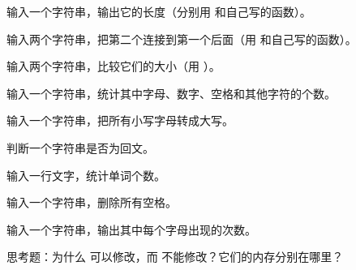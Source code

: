 \begin{problemset}
  \item 输入一个字符串，输出它的长度（分别用  和自己写的函数）。
  \item 输入两个字符串，把第二个连接到第一个后面（用  和自己写的函数）。
  \item 输入两个字符串，比较它们的大小（用 ）。
  \item 输入一个字符串，统计其中字母、数字、空格和其他字符的个数。
  \item 输入一个字符串，把所有小写字母转成大写。
  \item 判断一个字符串是否为回文。
  \item 输入一行文字，统计单词个数。
  \item 输入一个字符串，删除所有空格。
  \item 输入一个字符串，输出其中每个字母出现的次数。
  \item 思考题：为什么  可以修改，而  不能修改？它们的内存分别在哪里？
\end{problemset}
